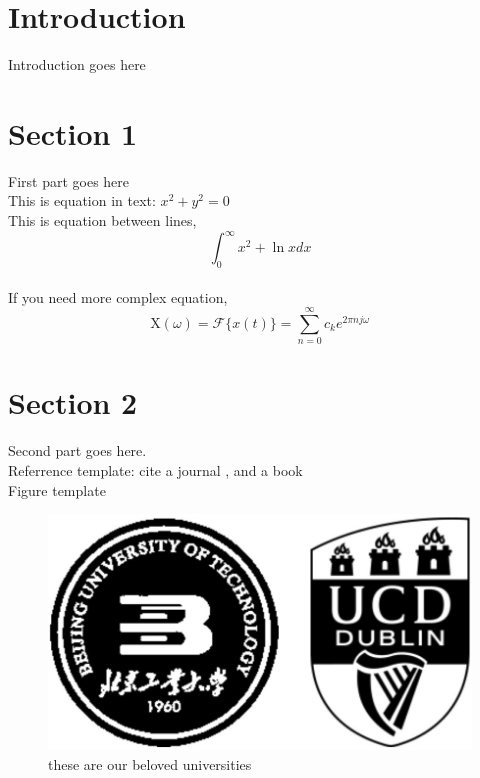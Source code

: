 \documentclass[11pt]{article}
\begin{document}
\tableofcontents

\section{Introduction}

	Introduction goes here

\section{Section 1}

	First part goes here \\
	This is equation in text: $x ^ 2 + y ^ 2 = 0$ \\ %
	This is equation between lines,
	$$\int _ {0} ^ {\infty} x ^ 2 + \ln x dx$$ %
	\\
	If you need more complex equation,
	\begin{equation}%
	\mathrm{X} \left( \omega \right) = \mathcal{F} \{ x \left( t \right) \} = \sum_{n = 0}^{\infty} c_k e^{2\pi n j \omega} 
    \end{equation}

\section{Section 2}

	Second part goes here. \\
	Referrence template: cite a journal \cite{cooley1965algorithm}, and a book \cite{proakis2001digital}\\
    Figure template
    \begin{figure}[ht]
    \centering
    \includegraphics[scale=0.3]{BDIC.jpeg}%
    \caption{these are our beloved universities}
    \label{fig:label}
    \end{figure}
\end{document}

